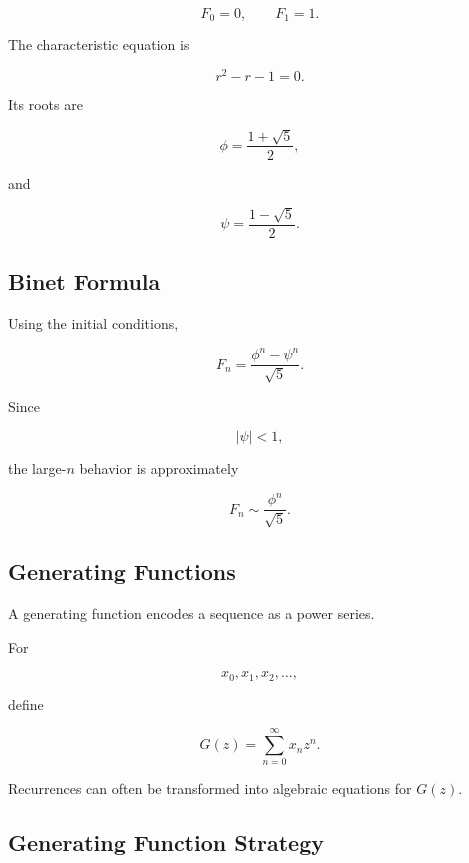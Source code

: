 \[
F_0=0,
\qquad
F_1=1.
\]

The characteristic equation is

\[
\boxed{
r^2-r-1=0.
}
\]

Its roots are

\[
\boxed{
\phi
=
\frac{
1+\sqrt5
}{
2
},
}
\]

and

\[
\boxed{
\psi
=
\frac{
1-\sqrt5
}{
2
}.
}
\]

\subsection{Binet Formula}
\label{subsec:binet-formula}

Using the initial conditions,

\[
\boxed{
F_n
=
\frac{
\phi^n-\psi^n
}{
\sqrt5
}.
}
\]

Since

\[
|\psi|<1,
\]

the large-\(n\) behavior is approximately

\[
\boxed{
F_n
\sim
\frac{
\phi^n
}{
\sqrt5
}.
}
\]

\subsection{Generating Functions}
\label{subsec:generating-functions-difference-equations}

A generating function encodes a sequence as a power series.

For

\[
x_0,x_1,x_2,\ldots,
\]

define

\[
\boxed{
G(z)
=
\sum_{n=0}^{\infty}
x_nz^n.
}
\]

Recurrences can often be transformed into algebraic equations for
\(G(z)\).

\subsection{Generating Function Strategy}
\label{subsec:generating-function-strategy}


